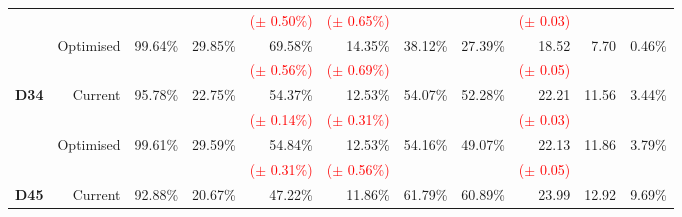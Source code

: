 \begin{tabular}{lrrrrrrrrrr}
                              &                            &                          &                          & \textcolor{red}{($\pm$ 0.50\%)} & \textcolor{red}{($\pm$ 0.65\%)} &                          &                          & \textcolor{red}{($\pm$ 0.03)} &                        &                         \\[2mm]
                              & \multirow{2}{*}{Optimised} & \multirow{2}{*}{99.64\%} & \multirow{2}{*}{29.85\%} & 69.58\%                         & 14.35\%                         & \multirow{2}{*}{38.12\%} & \multirow{2}{*}{27.39\%} & 18.52                         & \multirow{2}{*}{7.70}  & \multirow{2}{*}{0.46\%} \\
                              &                            &                          &                          & \textcolor{red}{($\pm$ 0.56\%)} & \textcolor{red}{($\pm$ 0.69\%)} &                          &                          & \textcolor{red}{($\pm$ 0.05)} &                        &                         \\
\midrule
\multirow{4}{*}{\textbf{D34}} & \multirow{2}{*}{Current}   & \multirow{2}{*}{95.78\%} & \multirow{2}{*}{22.75\%} & 54.37\%                         & 12.53\%                         & \multirow{2}{*}{54.07\%} & \multirow{2}{*}{52.28\%} & 22.21                         & \multirow{2}{*}{11.56} & \multirow{2}{*}{3.44\%} \\
                              &                            &                          &                          & \textcolor{red}{($\pm$ 0.14\%)} & \textcolor{red}{($\pm$ 0.31\%)} &                          &                          & \textcolor{red}{($\pm$ 0.03)} &                        &                         \\[2mm]
                              & \multirow{2}{*}{Optimised} & \multirow{2}{*}{99.61\%} & \multirow{2}{*}{29.59\%} & 54.84\%                         & 12.53\%                         & \multirow{2}{*}{54.16\%} & \multirow{2}{*}{49.07\%} & 22.13                         & \multirow{2}{*}{11.86} & \multirow{2}{*}{3.79\%} \\
                              &                            &                          &                          & \textcolor{red}{($\pm$ 0.31\%)} & \textcolor{red}{($\pm$ 0.56\%)} &                          &                          & \textcolor{red}{($\pm$ 0.05)} &                        &                         \\
\midrule
\multirow{4}{*}{\textbf{D45}} & \multirow{2}{*}{Current}   & \multirow{2}{*}{92.88\%} & \multirow{2}{*}{20.67\%} & 47.22\%                         & 11.86\%                         & \multirow{2}{*}{61.79\%} & \multirow{2}{*}{60.89\%} & 23.99                         & \multirow{2}{*}{12.92} & \multirow{2}{*}{9.69\%} \\

\end{tabular}
